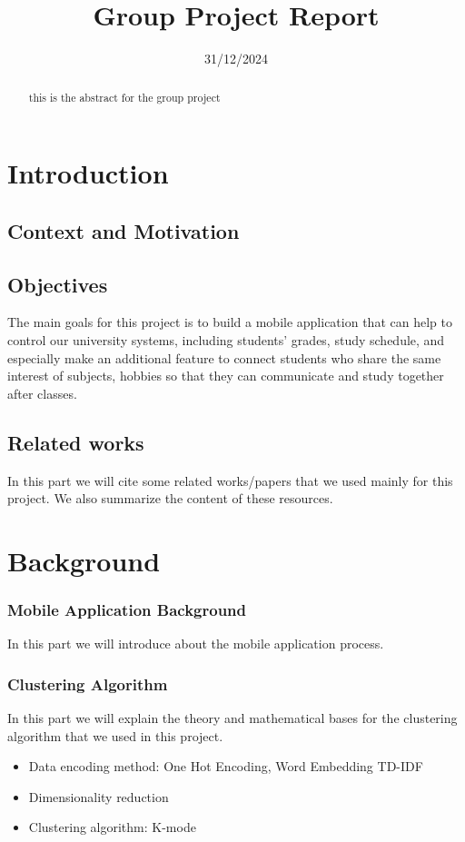 \documentclass{article}
\title{Group Project Report}
\author{}
\date{31/12/2024}
\begin{document}
\begin{abstract}
    this is the abstract for  the group project
\end{abstract}

\section{Introduction}

\subsection{Context and Motivation}

\subsection{Objectives}

    The main goals for this project is to build a mobile application
    that can help to control our university systems, including students'
    grades, study schedule, and especially make an additional feature to connect 
    students who share the same interest of subjects, hobbies so that they can communicate
    and study together after classes.


\subsection{Related works}

In this part we will cite some related works/papers that we used mainly for this 
project. We also summarize the content of these resources.


\section{Background}
\subsubsection{Mobile Application Background}
In this part we will introduce about the mobile application process.


\subsubsection{Clustering Algorithm}
In this part we will explain the theory and mathematical bases for
the clustering algorithm that we used in this project.
\begin{itemize} 
    \item Data encoding method: One Hot Encoding, Word Embedding TD-IDF
    \item Dimensionality reduction
    \item Clustering algorithm: K-mode

\end{itemize}
\end{document}
